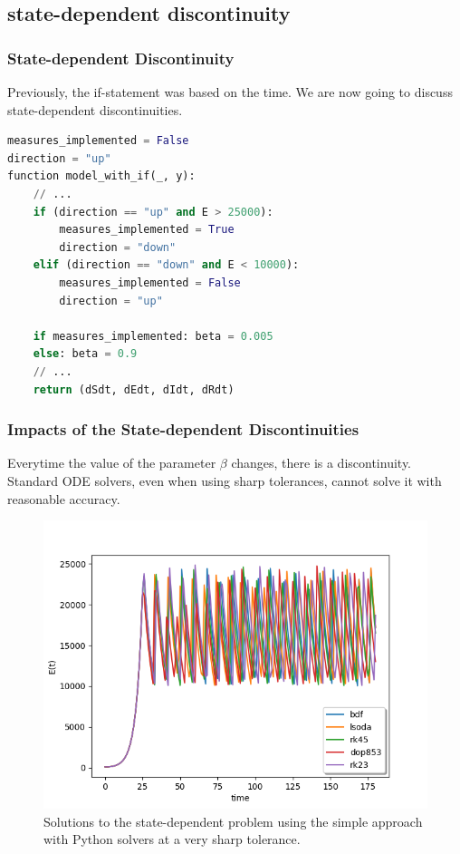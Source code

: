 \documentclass{beamer}
\begin{document}
\subsection{state-dependent discontinuity}
\begin{frame}[fragile]
\frametitle{State-dependent Discontinuity}
Previously, the if-statement was based on the time.
We are now going to discuss state-dependent discontinuities.
\begin{lstlisting}[language=Python]
measures_implemented = False
direction = "up"
function model_with_if(_, y):
    // ...
    if (direction == "up" and E > 25000):
        measures_implemented = True
        direction = "down"
    elif (direction == "down" and E < 10000):
        measures_implemented = False
        direction = "up"

    if measures_implemented: beta = 0.005 
    else: beta = 0.9
    // ...
    return (dSdt, dEdt, dIdt, dRdt)
\end{lstlisting}
\end{frame}

\begin{frame}
\frametitle{Impacts of the State-dependent Discontinuities}
Everytime the value of the parameter $\beta$ changes, there is a discontinuity.
Standard ODE solvers, even when using sharp tolerances, cannot solve it with reasonable accuracy.
\begin{figure}[H]
\centering
\includegraphics[width=0.7\linewidth]{./figures/state_discontinuity_sharp_py}
\caption{Solutions to the state-dependent problem using the simple approach with Python solvers at a very sharp tolerance.}
\label{fig:state_discontinuity_sharp_py}
\end{figure}
\end{frame}
\end{document}
